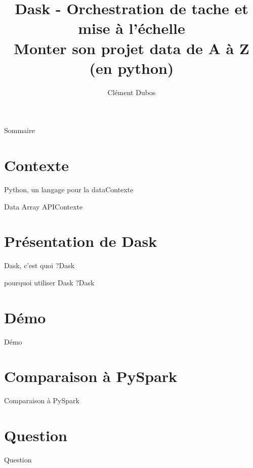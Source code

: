 \documentclass[aspectratio=169, xetex, 12pt]{beamer}
\title{Dask - Orchestration de tache et mise à l'échelle \\ \Large Monter son projet data de A à Z (en python)}
\author{Clément Dubos}
\institute{Extia}
\date{\displaydate{date}}
\begin{document}
    \maketitle

    \begin{frame}{Sommaire}
        \hfill
        \parbox[t]{.9\textwidth}{
            \begin{minipage}[c][0.2\textheight]{\textwidth}
                \Large
                \tableofcontents
            \end{minipage}
        }
    \end{frame}

    \section{Contexte}

    \begin{frame}{Python, un langage pour la data}{Contexte}
    \end{frame}

    \begin{frame}{Data Array API}{Contexte}
    \end{frame}

    \section{Présentation de Dask}
    \begin{frame}{Dask, c'est quoi ?}{Dask}
    \end{frame}

    \begin{frame}{pourquoi utiliser Dask ?}{Dask}
    \end{frame}

    \section{Démo}
    \begin{frame}{Démo}
    \end{frame}

    \section{Comparaison à PySpark}
    \begin{frame}{Comparaison à PySpark}
    \end{frame}

    \section{Question}
    \begin{frame}{Question}
    \end{frame}
\end{document}
